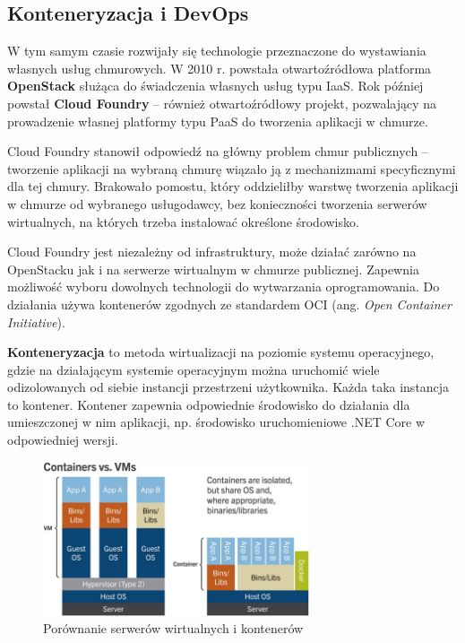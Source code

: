 \documentclass[12pt,a4paper,twoside,titlepage,openright]{book}
\begin{document}
\subsection{Konteneryzacja i DevOps} \label{section:konteneryzacja}

W tym samym czasie rozwijały się technologie przeznaczone do wystawiania własnych usług chmurowych. W 2010 r. powstała otwartoźródłowa platforma \textbf{OpenStack} służąca do świadczenia własnych usług typu IaaS. Rok później powstał \textbf{Cloud Foundry} -- również otwartoźródłowy projekt, pozwalający na prowadzenie własnej platformy typu PaaS do tworzenia aplikacji w chmurze. 

Cloud Foundry stanowił odpowiedź na główny problem chmur publicznych -- tworzenie aplikacji na wybraną chmurę wiązało ją z mechanizmami specyficznymi dla tej chmury. Brakowało pomostu, który oddzieliłby warstwę tworzenia aplikacji w chmurze od wybranego usługodawcy, bez konieczności tworzenia serwerów wirtualnych, na których trzeba instalować określone środowisko. \cite{cloudFoundry}

Cloud Foundry jest niezależny od infrastruktury, może działać zarówno na OpenStacku jak i na serwerze wirtualnym w chmurze publicznej. Zapewnia możliwość wyboru dowolnych technologii do wytwarzania oprogramowania. Do działania używa kontenerów zgodnych ze standardem OCI (ang. \textit{Open Container Initiative}). \cite{cloudFoundry} 

\textbf{Konteneryzacja} to metoda wirtualizacji na poziomie systemu operacyjnego, gdzie na działającym systemie operacyjnym można uruchomić wiele odizolowanych od siebie instancji przestrzeni użytkownika. Każda taka instancja to kontener. Kontener zapewnia odpowiednie środowisko do działania dla umieszczonej w nim aplikacji, np. środowisko uruchomieniowe .NET Core w odpowiedniej wersji.  \cite{cloudFoundry,ccSpringer}

\begin{figure}[h]
	\centering
			\includegraphics[width=0.7\textwidth]{containers-vs-vms.png}
		\caption{Porównanie serwerów wirtualnych i kontenerów \cite{ccSpringer}}
		\label{fig:containers-vs-vms}
\end{figure}
\end{document}
